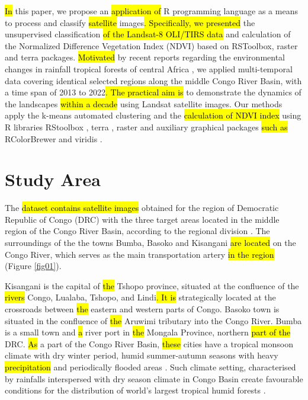 \documentclass[applsci,article,submit,pdftex,moreauthors]{Definitions/mdpi}
\begin{document}
\hl{In }this paper, we propose an \hl{application of} R programming language \cite{RCoreTeam} as a means to process and classify \hl{satellite} images\hl{. Specifically, we presented} the unsupervised classification \hl{of the Landsat-8 OLI/TIRS data} and calculation of the Normalized Difference Vegetation Index (NDVI) based on RSToolbox, raster and terra packages.\hl{ Motivated }by recent reports regarding the environmental changes in rainfall tropical forests of central Africa \cite{Wasseige,lescuyer2010chainsaw,Jayathilake,POTAPOV2012106,Shapiro,7326202}, we applied multi-temporal data covering identical selected regions along the\hl{ }middle Congo River Basin, with a time span of 2013 to 2022\hl{. The practical aim is }to demonstrate the dynamics of the landscapes \hl{within a decade} using Landsat satellite images. Our methods apply the k-means automated clustering and the \hl{calculation of NDVI index} using R libraries RStoolbox \cite{RStoolbox}, terra \cite{RTerra}, raster \cite{Hijmans} and auxiliary graphical packages \hl{such as} RColorBrewer \cite{Neuwirth} and viridis \cite{viridis}. 

\section{Study Area}

The \hl{dataset contains satellite images} obtained for the region of Democratic Republic of Congo (DRC) with the three target areas located in the middle region of the Congo River Basin, according to the regional\hl{ }division \cite{MUSHI201964}. The surroundings\hl{ }of the the towns Bumba, Basoko and Kisangani \hl{are located} on the Congo River, which serves as the main transportation artery \hl{in the region} (Figure \ref{fig01}). 

Kisangani is the capital of \hl{the} Tshopo province, situated at the confluence of the \hl{rivers} Congo, Lualaba, Tshopo, and Lindi\hl{. It is }strategically located at the crossroads between \hl{the} eastern and western parts of Congo. Basoko town is situated in the confluence of \hl{the} Aruwimi tributary into the Congo River. Bumba is a small town and \hl{a} river port in \hl{the} Mongala Province, northern \hl{part of the} DRC. \hl{As} a part of the Congo River Basin, \hl{these} cities have a tropical monsoon climate with dry\hl{ }winter period, humid summer-autumn seasons with heavy \hl{precipitation} and periodically flooded areas \cite{6571272}. Such climate setting, characterised by\hl{ }rainfalls interspersed with dry season climate in Congo Basin create favourable conditions for the distribution of world's largest tropical humid forests \cite{Washington}. 
\end{document}
